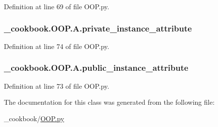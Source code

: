 Definition at line 69 of file O\-O\-P.\-py.

\hypertarget{class__cookbook_1_1OOP_1_1A_ab13df620204437ce904e7d8d582dab9c}{
\subsubsection[{private\-\_\-instance\-\_\-attribute}]{\setlength{\rightskip}{0pt plus 5cm}\-\_\-cookbook.\-O\-O\-P.\-A.\-private\-\_\-instance\-\_\-attribute}}\label{class__cookbook_1_1OOP_1_1A_ab13df620204437ce904e7d8d582dab9c}


Definition at line 74 of file O\-O\-P.\-py.

\hypertarget{class__cookbook_1_1OOP_1_1A_a3ff5d9c90ff2e8a6cb22e6e031085b87}{
\subsubsection[{public\-\_\-instance\-\_\-attribute}]{\setlength{\rightskip}{0pt plus 5cm}\-\_\-cookbook.\-O\-O\-P.\-A.\-public\-\_\-instance\-\_\-attribute}}\label{class__cookbook_1_1OOP_1_1A_a3ff5d9c90ff2e8a6cb22e6e031085b87}


Definition at line 73 of file O\-O\-P.\-py.



The documentation for this class was generated from the following file\-:\begin{DoxyCompactItemize}
\item 
\-\_\-cookbook/\hyperlink{OOP_8py}{O\-O\-P.\-py}\end{DoxyCompactItemize}
